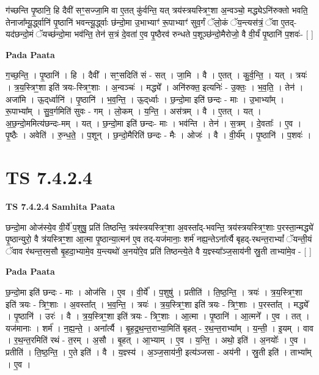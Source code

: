 \documentclass[17pt]{extarticle}
\begin{document}
ग॑च्छन्ति पृ॒ष्ठानि॒ हि दैवी॑ सꣳ॒॒सज्जा॒मि वा ए॒तत् कु॑र्वन्ति॒ यत् त्रय॑स्त्रयस्त्रिꣳ॒॒शा अ॒न्वञ्चो॒ मद्ध्येऽनि॑रुक्तो भवति॒ तेनाजा᳚म्यू॒र्द्ध्वानि॑ पृ॒ष्ठानि॑ भवन्त्यू॒र्द्ध्वाः छ॑न्दो॒मा उ॒भाभ्याꣳ॑ रू॒पाभ्याꣳ॑ सुव॒र्गं ॅलो॒कं ॅय॒न्त्यस॑त्रं॒ ॅवा ए॒तद्-यद॑छन्दो॒मं ॅयच्छ॑न्दो॒मा भव॑न्ति॒ तेन॑ स॒त्रं दे॒वता॑ ए॒व पृ॒ष्ठैरव॑ रुन्धते प॒शूञ्छ॑न्दो॒मैरोजो॒ वै वी॒र्यं॑ पृ॒ष्ठानि॑ प॒शवः॑- [  ] \newline

\textbf{Pada Paata} \newline

ग॒च्छ॒न्ति॒ । पृ॒ष्ठानि॑ । हि । दैवी᳚ । सꣳ॒॒सदिति॑ सं - सत् । जा॒मि । वै । ए॒तत् । कु॒र्व॒न्ति॒ । यत् । त्रयः॑ । त्र॒य॒स्त्रिꣳ॒॒शा इति॑ त्रयः-स्त्रिꣳ॒॒शाः । अ॒न्वञ्चः॑ । मद्ध्ये᳚ । अनि॑रुक्त॒ इत्यनिः॑ - उ॒क्तः॒ । भ॒व॒ति॒ । तेन॑ । अजा॑मि । ऊ॒द्‌र्ध्वानि॑ । पृ॒ष्ठानि॑ । भ॒व॒न्ति॒ । ऊ॒द्‌र्ध्वाः । छ॒न्दो॒मा इति॑ छन्दः - माः । उ॒भाभ्या᳚म् । रू॒पाभ्या᳚म् । सु॒व॒र्गमिति॑ सुवः - गम् । लो॒कम् । य॒न्ति॒ । अस॑त्रम् । वै । ए॒तत् । यत् । अ॒छ॒न्दो॒ममित्य॑छन्दः-मम् । यत् । छ॒न्दो॒मा इति॑ छन्दः- माः । भव॑न्ति । तेन॑ । स॒त्रम् । दे॒वताः᳚ । ए॒व । पृ॒ष्ठैः । अवेति॑ । रु॒न्ध॒ते॒ । प॒शून् । छ॒न्दो॒मैरिति॑ छन्दः - मैः । ओजः॑ । वै । वी॒र्य᳚म् । पृ॒ष्ठानि॑ । प॒शवः॑ ।  \newline




\section*{ TS 7.4.2.4 }

\textbf{TS 7.4.2.4 } \newline
\textbf{Samhita Paata} \newline

छन्दो॒मा ओज॑स्ये॒व वी॒र्ये॑ प॒शुषु॒ प्रति॑ तिष्ठन्ति॒ त्रय॑स्त्रयस्त्रिꣳ॒॒शा अ॒वस्ता᳚द्-भवन्ति॒ त्रय॑स्त्रयस्त्रिꣳ॒॒शाः प॒रस्ता॒न्मद्ध्ये॑ पृ॒ष्ठान्युरो॒ वै त्र॑यस्त्रिꣳ॒॒शा आ॒त्मा पृ॒ष्ठान्या॒त्मन॑ ए॒व तद्-यज॑मानाः॒ शर्म॑ नह्य॒न्तेऽना᳚र्त्यै बृहद्-रथन्त॒राभ्यां᳚ ॅयन्ती॒यं ॅवाव र॑थन्त॒रम॒सौ बृ॒हदा॒भ्यामे॒व य॒न्त्यथो॑ अ॒नयो॑रे॒व प्रति॑ तिष्ठन्त्ये॒ते वै य॒ज्ञ्स्या᳚ञ्ज॒साय॑नी स्रु॒ती ताभ्या॑मे॒व - [  ] \newline

\textbf{Pada Paata} \newline

छ॒न्दो॒मा इति॑ छन्दः - माः । ओज॑सि । ए॒व । वी॒र्ये᳚ । प॒शुषु॑ । प्रतीति॑ । ति॒ष्ठ॒न्ति॒ । त्रयः॑ । त्र॒य॒स्त्रिꣳ॒॒शा इति॑ त्रयः - त्रिꣳ॒॒शाः । अ॒वस्ता᳚त् । भ॒व॒न्ति॒ । त्रयः॑ । त्र॒य॒स्त्रिꣳ॒॒शा इति॑ त्रयः - त्रिꣳ॒॒शाः । प॒रस्ता᳚त् । मद्ध्ये᳚ । पृ॒ष्ठानि॑ । उरः॑ । वै । त्र॒य॒स्त्रिꣳ॒॒शा इति॑ त्रयः - त्रिꣳ॒॒शाः । आ॒त्मा । पृ॒ष्ठानि॑ । आ॒त्मने᳚ । ए॒व । तत् । यज॑मानाः । शर्म॑ । न॒ह्य॒न्ते॒ । अना᳚र्त्यै । बृ॒ह॒द्र॒थ॒न्त॒राभ्या॒मिति॑ बृहत् - र॒थ॒न्त॒राभ्या᳚म् । य॒न्ती॒ । इ॒यम् । वाव । र॒थ॒न्त॒रमिति॑ रथं - त॒रम् । अ॒सौ । बृ॒हत् । आ॒भ्याम् । ए॒व । य॒न्ति॒ । अथो॒ इति॑ । अ॒नयोः᳚ । ए॒व । प्रतीति॑ । ति॒ष्ठ॒न्ति॒ । ए॒ते इति॑ । वै । य॒ज्ञ्स्य॑ । अ॒ञ्ज॒साय॑नी॒ इत्य॑ञ्जसा - अय॑नी । स्रु॒ती इति॑ । ताभ्या᳚म् । ए॒व ।  \newline
\end{document}
